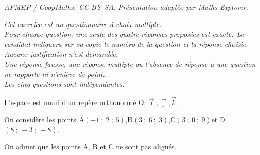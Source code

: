 \documentclass[10pt]{article}
\providecommand{\Oijk}{\(\mathrm{O};\vec{\imath},\vec{\jmath},\vec{k}\)}
\begin{document}
\noindent\textit{APMEP / CoopMaths. CC BY-SA. Présentation adaptée par Maths Explorer.}\par\medskip
\medskip

\emph{Cet exercice est un questionnaire à choix multiple.\\
Pour chaque question, une seule des quatre réponses proposées est exacte. Le candidat indiquera sur sa copie le numéro de la question et la réponse choisie. Aucune justification n'est demandée.\\
Une réponse fausse, une réponse multiple ou l'absence de réponse à une question ne rapporte ni n'enlève de point.\\
Les cinq questions sont indépendantes.}

\medskip

L'espace est muni d'un repère orthonormé \Oijk.

\smallskip

On considère les points A$(-1~;~2~;~5)$,\quad B$(3~;~6~;~3)$,\quad C$(3~;~0~;~9)$\quad et \quad D$(8~;~-3~;~-8)$.

On admet que les points A, B et C ne sont pas alignés.
\end{document}
